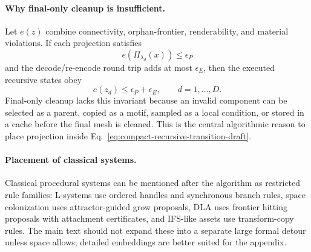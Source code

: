 \paragraph{Why final-only cleanup is insufficient.}
Let \(e(z)\) combine connectivity, orphan-frontier, renderability, and material
violations. If each projection satisfies
\begin{equation}
e(\Pi_{\lambda_d}(x))\le\epsilon_P
\end{equation}
and the decode/re-encode round trip adds at most \(\epsilon_E\), then the
executed recursive states obey
\begin{equation}
e(z_d)\le \epsilon_P+\epsilon_E,\qquad d=1,\ldots,D.
\end{equation}
Final-only cleanup lacks this invariant because an invalid component can be
selected as a parent, copied as a motif, sampled as a local condition, or stored
in a cache before the final mesh is cleaned. This is the central algorithmic
reason to place projection inside Eq.~\eqref{eq:compact-recursive-transition-draft}.

\paragraph{Placement of classical systems.}
Classical procedural systems can be mentioned after the algorithm as restricted
rule families: L-systems use ordered handles and synchronous branch rules,
space colonization uses attractor-guided grow proposals, DLA uses frontier
hitting proposals with attachment certificates, and IFS-like assets use
transform-copy rules. The main text should not expand these into a separate
large formal detour unless space allows; detailed embeddings are better suited
for the appendix.
